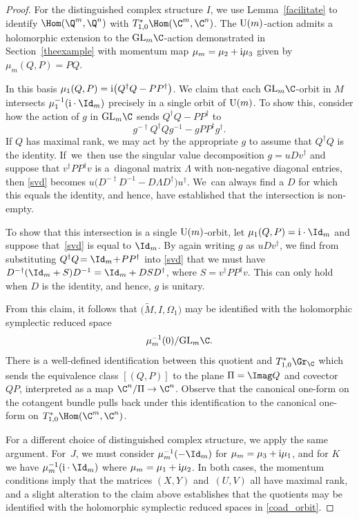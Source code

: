 \begin{proof}
	For the distinguished complex structure $I$, we use Lemma~\ref{facilitate} to identify $\Hom(\Q^m,\Q^n)$ with ${T^*_{1,0}\Hom(\C^m,\C^n)}$. The ${\rm U}(m)$-action admits a holomorphic extension to the ${\rm GL}_m\C$-action demonstrated in Section~\ref{theexample} with momentum map $\mu_m=\mu_2+{\rm i}\mu_3$ given by $\mu_m(Q,P)=PQ$.
	
	In this basis $\mu_1(Q,P)={\rm i}\bigl(Q^\dagger Q-PP^\dagger\bigr)$. We claim that each ${\rm GL}_m\C$-orbit in $M$ intersects $\mu_1^{-1}({\rm i}\cdot\Id_m)$ precisely in a single orbit of ${\rm U}(m)$. To show this, consider how the action of $g$ in ${\rm GL}_m\C$ sends $Q^\dagger Q-PP^\dagger$ to
	\begin{equation}\label{svd}
		g^{-\dagger}Q^\dagger Qg^{-1}-gPP^\dagger g^{\dagger}.
	\end{equation}
	If $Q$ has maximal rank, we may act by the appropriate $g$ to assume that $Q^\dagger Q$ is the identity. If~we~then use the singular value decomposition $g=uDv^\dagger$ and suppose that $v^\dagger PP^\dagger v$ is a~diagonal matrix $\Lambda$ with non-negative diagonal entries, then \eqref{svd} becomes $u\bigl(D^{-\dagger}D^{-1}-D\Lambda D^\dagger\bigr)u^\dagger$. We~can always find a $D$ for which this equals the identity, and hence, have established that the intersection is non-empty.
	
	To show that this intersection is a single ${\rm U}(m)$-orbit, let $\mu_1(Q,P)={\rm i}\cdot\Id_m$ and suppose that~\eqref{svd} is equal to $\Id_m$. By again writing $g$ as $uDv^\dagger$, we find from substituting ${Q^\dagger Q\!=\Id_m\!+\!PP^\dagger}$ into \eqref{svd} that we must have $D^{-\dagger}(\Id_m+S)D^{-1}=\Id_m+DSD^\dagger$, where $S=v^\dagger PP^\dagger v$. This can only hold when $D$ is the identity, and hence, $g$ is unitary.
	
	From this claim, it follows that $\bigl(\tilde{M},I,\Omega_1\bigr)$ may be identified with the holomorphic symplectic reduced space
	\begin{equation*}%
		\mu_m^{-1}(0)/{\rm GL}_m\C.
	\end{equation*}
	There is a well-defined identification between this quotient and $T^*_{1,0}\Gr_\C$ which sends the equivalence class $[(Q,P)]$ to the plane $\Pi=\Imag Q$ and covector $QP$, interpreted as a map $\C^n/\Pi\rightarrow\C^n$. Observe that the canonical one-form on the cotangent bundle pulls back under this identification to the canonical one-form on $T^*_{1,0}\Hom(\C^m,\C^n)$.
	
	For a different choice of distinguished complex structure, we apply the same argument. For~$J$, we must consider $\mu_m^{-1}(-\Id_m)$ for $\mu_m=\mu_3+{\rm i}\mu_1$, and for $K$ we have $\mu_m^{-1}({\rm i}\cdot\Id_m)$ where ${\mu_m=\mu_1+{\rm i}\mu_2}$. In both cases, the momentum conditions imply that the matrices $(X,Y)$ and~$(U,V)$ all have maximal rank, and a slight alteration to the claim above establishes that the quotients may be identified with the holomorphic symplectic reduced spaces in \eqref{coad_orbit}.
\end{proof}

